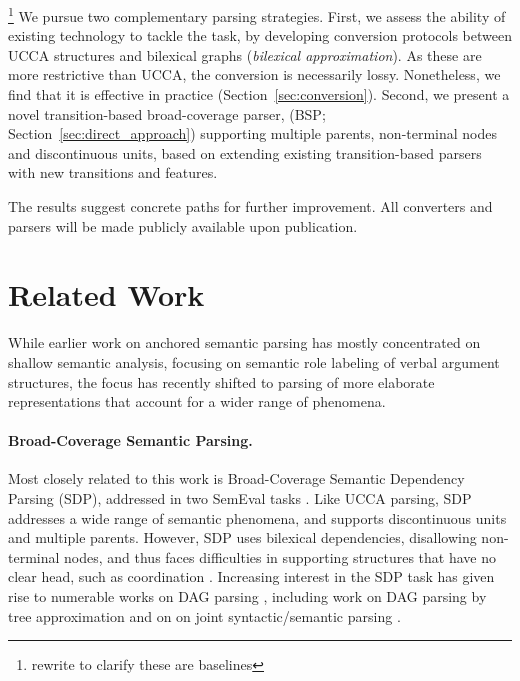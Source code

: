 \documentclass[11pt]{article}
\newcommand{\daniel}[1]{\footnote{\color{blue} #1}}
\newcommand{\secref}[1]{Section~\ref{#1}}
\begin{document}
\daniel{rewrite to clarify these are baselines}
We pursue two complementary parsing strategies.
First, we assess the ability of existing technology to tackle the task,
by developing conversion protocols between UCCA structures and bilexical graphs
(\emph{bilexical approximation}).
As these are more restrictive than UCCA, the conversion
is necessarily lossy. Nonetheless, we find that it is effective
in practice (\secref{sec:conversion}).
Second, we present a novel transition-based broad-coverage parser,
(BSP; \secref{sec:direct_approach})
supporting multiple parents, non-terminal nodes and discontinuous units,
based on extending existing transition-based parsers
with new transitions and features.

The results suggest concrete paths for further improvement.
All converters and parsers will be made publicly available upon publication.



\section{Related Work}\label{sec:related_work}
While earlier work on anchored semantic parsing has mostly concentrated on shallow semantic analysis,
focusing on semantic role labeling of verbal argument structures,
the focus has recently shifted to parsing of more elaborate representations that account
for a wider range of phenomena.


\paragraph{Broad-Coverage Semantic Parsing.}
Most closely related to this work is Broad-Coverage Semantic Dependency Parsing (SDP),
addressed in two SemEval tasks \cite{oepen2014semeval,oepen2015semeval}.
Like UCCA parsing, SDP addresses a wide range of semantic phenomena,
and supports discontinuous units and multiple parents. However, SDP uses
bilexical dependencies, disallowing non-terminal nodes, and thus faces difficulties in supporting
structures that have no clear head, such as coordination \cite{Ivanova2012who}.
Increasing interest in the SDP task has given rise to numerable works on DAG parsing
\cite{ribeyre-villemontedelaclergerie-seddah:2014:SemEval,thomson-EtAl:2014:SemEval,almeida-martins:2015:SemEval,du-EtAl:2015:SemEval}, including work on DAG parsing by tree approximation
\cite{agic-koller:2014:SemEval,schluter-EtAl:2014:SemEval}
and on on joint syntactic/semantic parsing
\cite{henderson2013multilingual,swayamdipta-EtAl:2016:CoNLL}.
\end{document}
